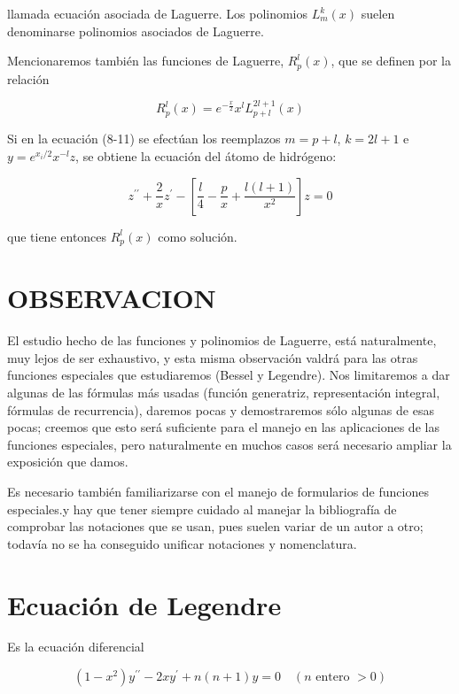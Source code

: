 \documentclass[10pt]{article}
\theoremstyle{plain}
\theoremstyle{definition}
\theoremstyle{remark}
\begin{document}
llamada ecuación asociada de Laguerre. Los polinomios $L_{m}^{k}(x)$ suelen denominarse polinomios asociados de Laguerre.

Mencionaremos también las funciones de Laguerre, $R_{p}^{l}(x)$, que se definen por la relación


\begin{equation*}
R_{p}^{l}(x)=e^{-\frac{x}{2}} x^{l} L_{p+l}^{2 l+1}(x) \tag{8-12}
\end{equation*}


Si en la ecuación (8-11) se efectúan los reemplazos $m=p+l$, $k=2 l+1$ e $y=e^{x_{i} / 2} x^{-l} z$, se obtiene la ecuación del átomo de hidrógeno:


\begin{equation*}
z^{\prime \prime}+\frac{2}{x} z^{\prime}-\left[\frac{l}{4}-\frac{p}{x}+\frac{l(l+1)}{x^{2}}\right] z=0 \tag{8-13}
\end{equation*}


que tiene entonces $R_{p}^{l}(x)$ como solución.


\section*{OBSERVACION}
El estudio hecho de las funciones y polinomios de Laguerre, está naturalmente, muy lejos de ser exhaustivo, y esta misma observación valdrá para las otras funciones especiales que estudiaremos (Bessel y Legendre). Nos limitaremos a dar algunas de las fórmulas más usadas (función generatriz, representación integral, fórmulas de recurrencia), daremos pocas y demostraremos sólo algunas de esas pocas; creemos que esto será suficiente para el manejo en las aplicaciones de las funciones especiales, pero naturalmente en muchos casos será necesario ampliar la exposición que damos.

Es necesario también familiarizarse con el manejo de formularios de funciones especiales.y hay que tener siempre cuidado al manejar la bibliografía de comprobar las notaciones que se usan, pues suelen variar de un autor a otro; todavía no se ha conseguido unificar notaciones y nomenclatura.

\section{Ecuación de Legendre}
Es la ecuación diferencial


\begin{equation*}
\left(1-x^{2}\right) y^{\prime \prime}-2 x y^{\prime}+n(n+1) y=0 \quad(n \text { entero }>0) \tag{9-1}
\end{equation*}
\end{document}

